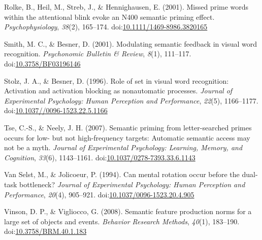 \documentclass[english,man]{apa6}
\theoremstyle{definition}
\theoremstyle{definition}
\theoremstyle{remark}
\begin{document}
\hypertarget{ref-Rolke2001}{}
Rolke, B., Heil, M., Streb, J., \& Hennighausen, E. (2001). Missed prime
words within the attentional blink evoke an N400 semantic priming
effect. \emph{Psychophysiology}, \emph{38}(2), 165--174.
doi:\href{https://doi.org/10.1111/1469-8986.3820165}{10.1111/1469-8986.3820165}

\hypertarget{ref-Smith2001}{}
Smith, M. C., \& Besner, D. (2001). Modulating semantic feedback in
visual word recognition. \emph{Psychonomic Bulletin \& Review},
\emph{8}(1), 111--117.
doi:\href{https://doi.org/10.3758/BF03196146}{10.3758/BF03196146}

\hypertarget{ref-Stolz1996a}{}
Stolz, J. A., \& Besner, D. (1996). Role of set in visual word
recognition: Activation and activation blocking as nonautomatic
processes. \emph{Journal of Experimental Psychology: Human Perception
and Performance}, \emph{22}(5), 1166--1177.
doi:\href{https://doi.org/10.1037//0096-1523.22.5.1166}{10.1037//0096-1523.22.5.1166}

\hypertarget{ref-Tse2007}{}
Tse, C.-S., \& Neely, J. H. (2007). Semantic priming from
letter-searched primes occurs for low- but not high-frequency targets:
Automatic semantic access may not be a myth. \emph{Journal of
Experimental Psychology: Learning, Memory, and Cognition}, \emph{33}(6),
1143--1161.
doi:\href{https://doi.org/10.1037/0278-7393.33.6.1143}{10.1037/0278-7393.33.6.1143}

\hypertarget{ref-VanSelst1994}{}
Van Selst, M., \& Jolicoeur, P. (1994). Can mental rotation occur before
the dual-task bottleneck? \emph{Journal of Experimental Psychology:
Human Perception and Performance}, \emph{20}(4), 905--921.
doi:\href{https://doi.org/10.1037/0096-1523.20.4.905}{10.1037/0096-1523.20.4.905}

\hypertarget{ref-Vinson2008}{}
Vinson, D. P., \& Vigliocco, G. (2008). Semantic feature production
norms for a large set of objects and events. \emph{Behavior Research
Methods}, \emph{40}(1), 183--190.
doi:\href{https://doi.org/10.3758/BRM.40.1.183}{10.3758/BRM.40.1.183}
\end{document}
